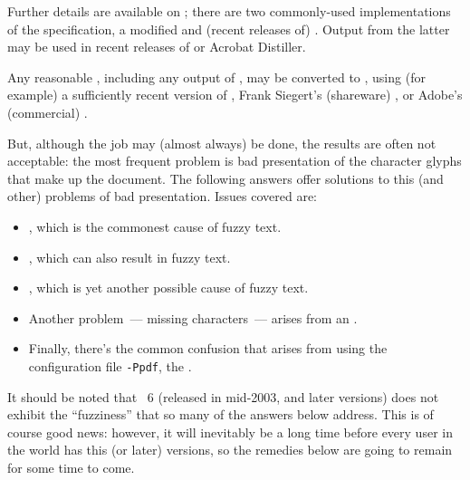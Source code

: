 Further details are available on ; there
are two commonly-used implementations of the specification, a
modified  and (recent releases of)
. Output from the latter may be used in recent
releases of \href{http://www.ghostscript.com/}{}
or Acrobat Distiller.


Any reasonable \PS{}, including any output of , may be
converted to , using (for example) a sufficiently recent
version of \href{http://www.ghostscript.com/}{},
Frank Siegert's (shareware)
\href{http://www.pstill.com/}{}, or Adobe's (commercial)
.

But, although the job may (almost always) be done, the results are
often not acceptable: the most frequent problem is bad presentation of
the character glyphs that make up the document.  The following answers
offer solutions to this (and other) problems of bad presentation.
Issues covered are:
\begin{itemize}
\item {}, which is
  the commonest cause of fuzzy text.
\item {},
  which can also result in fuzzy text.
\item {},
  which is yet another possible cause of fuzzy text.
\item Another problem~--- missing characters~--- arises from an
  .
\item Finally, there's the common confusion that arises from using the
   configuration file \texttt{-Ppdf}, the %
  .
\end{itemize}
It should be noted that  %
~6 (released in mid-2003, and later versions) does
not exhibit the ``fuzziness'' that so many of the answers below
address.  This is of course good news: however, it will inevitably be
a long time before every user in the world has this (or later)
versions, so the remedies below are going to remain for some time to
come.

